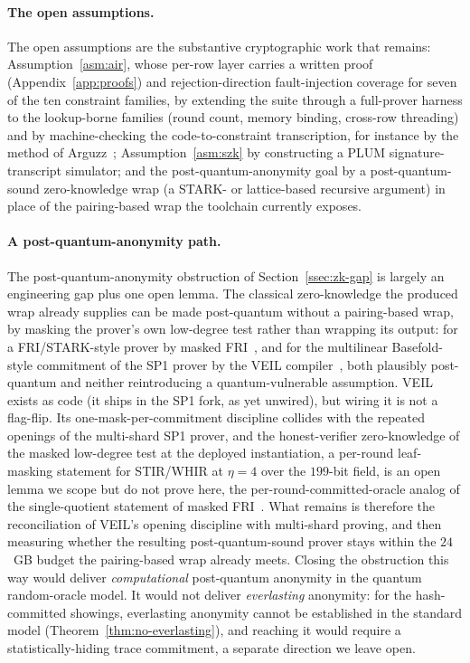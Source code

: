 \paragraph{The open assumptions.}
The open assumptions are the substantive cryptographic work that remains: Assumption~\ref{asm:air}, whose per-row layer carries a written proof (Appendix~\ref{app:proofs}) and rejection-direction fault-injection coverage for seven of the ten constraint families, by extending the suite through a full-prover harness to the lookup-borne families (round count, memory binding, cross-row threading) and by machine-checking the code-to-constraint transcription, for instance by the method of Arguzz~\cite{hochrainer2025arguzz}; Assumption~\ref{asm:szk} by constructing a PLUM signature-transcript simulator; and the post-quantum-anonymity goal by a post-quantum-sound zero-knowledge wrap (a STARK- or lattice-based recursive argument) in place of the pairing-based wrap the toolchain currently exposes.

\paragraph{A post-quantum-anonymity path.}
The post-quantum-anonymity obstruction of Section~\ref{ssec:zk-gap} is largely an engineering gap plus one open lemma. The classical zero-knowledge the produced wrap already supplies can be made post-quantum without a pairing-based wrap, by masking the prover's own low-degree test rather than wrapping its output: for a {FRI}/{STARK}-style prover by masked {FRI}~\cite{cryptoeprint:2024/1037}, and for the multilinear Basefold-style commitment of the SP1 prover by the VEIL compiler~\cite{cryptoeprint:2026/683}, both plausibly post-quantum and neither reintroducing a quantum-vulnerable assumption. VEIL exists as code (it ships in the SP1 fork, as yet unwired), but wiring it is not a flag-flip. Its one-mask-per-commitment discipline collides with the repeated openings of the multi-shard SP1 prover, and the honest-verifier zero-knowledge of the masked low-degree test at the deployed instantiation, a per-round leaf-masking statement for STIR/WHIR at $\eta=4$ over the $199$-bit field, is an open lemma we scope but do not prove here, the per-round-committed-oracle analog of the single-quotient statement of masked {FRI}~\cite{cryptoeprint:2024/1037}. What remains is therefore the reconciliation of VEIL's opening discipline with multi-shard proving, and then measuring whether the resulting post-quantum-sound prover stays within the $24$~GB budget the pairing-based wrap already meets. Closing the obstruction this way would deliver \emph{computational} post-quantum anonymity in the quantum random-oracle model. It would not deliver \emph{everlasting} anonymity: for the hash-committed showings, everlasting anonymity cannot be established in the standard model (Theorem~\ref{thm:no-everlasting}), and reaching it would require a statistically-hiding trace commitment, a separate direction we leave open.

